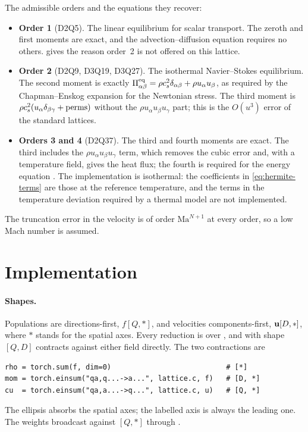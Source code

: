 The admissible orders and the equations they recover:
\begin{itemize}[nosep]
\item \textbf{Order 1} (D2Q5). The linear equilibrium for scalar transport. The zeroth and
      first moments are exact, and the advection--diffusion equation requires no others.
       gives the reason order~2 is not offered on this lattice.
\item \textbf{Order 2} (D2Q9, D3Q19, D3Q27). The isothermal Navier--Stokes equilibrium. The
      second moment is exactly $\Pi^{\mathrm{eq}}_{\alpha\beta} = \rho c_s^2\delta_{\alpha\beta}
      + \rho u_\alpha u_\beta$, as required by the Chapman--Enskog expansion for the
      Newtonian stress. The third moment is
      $\rho c_s^2(u_\alpha\delta_{\beta\gamma} + \text{perms})$ without the
      $\rho u_\alpha u_\beta u_\gamma$ part; this is the $O(u^3)$ error of the standard
      lattices.
\item \textbf{Orders 3 and 4} (D2Q37). The third and fourth moments are exact. The third
      includes the $\rho u_\alpha u_\beta u_\gamma$ term, which removes the cubic error and,
      with a temperature field, gives the heat flux; the fourth is required for the energy
      equation \parencite{Philippi2006,Sbragaglia2009}. The implementation is isothermal:
      the coefficients in \cref{eq:hermite-terms} are those at the reference temperature,
      and the terms in the temperature deviation required by a thermal model are not
      implemented.
\end{itemize}
The truncation error in the velocity is of order $\mathrm{Ma}^{N+1}$ at every order, so a
low Mach number is assumed.


\section{Implementation}\label{sec:eq-impl}

\paragraph{Shapes.}
Populations are directions-first, $f[Q, \ast]$, and velocities components-first,
$\mathbf{u}[D, \ast]$, where $\ast$ stands for the spatial axes. Every reduction is over
, and  with shape $[Q, D]$ contracts against either field
directly. The two contractions are
\begin{lstlisting}[style=py]
rho = torch.sum(f, dim=0)                           # [*]
mom = torch.einsum("qa,q...->a...", lattice.c, f)   # [D, *]
cu  = torch.einsum("qa,a...->q...", lattice.c, u)   # [Q, *]
\end{lstlisting}
The ellipsis absorbs the spatial axes; the labelled axis is always the leading one. The
weights broadcast against $[Q, \ast]$ through
.

